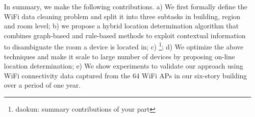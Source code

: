 












In summary, we make the following contributions. a) We first formally define the WiFi data cleaning problem and split it into three subtasks in building, region and room level; b) we propose a hybrid location determination  algorithm that combines graph-based and rule-based methods to exploit contextual information to disambiguate the room a device is located in; c) \footnote{daokun: summary contributions of your part}; d) We optimize the above techniques and make it scale to large number of devices by proposing on-line location determination; e) We show experiments to validate our approach using WiFi connectivity data captured from the 64 WiFi APs in our six-story building over a period of one year. 




